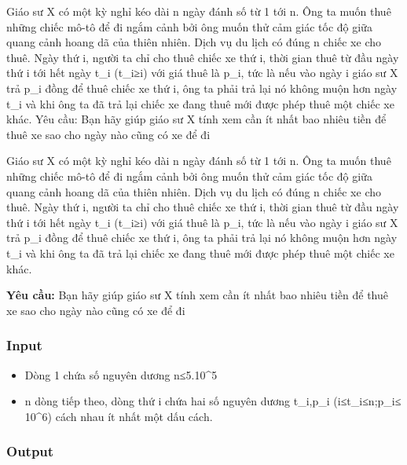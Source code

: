 



     Giáo sư X có một kỳ nghỉ kéo dài n ngày đánh số từ 1 tới n. Ông ta muốn thuê những chiếc mô-tô để đi ngắm cảnh bởi ông muốn thử cảm giác tốc độ giữa quang cảnh hoang dã của thiên nhiên. Dịch vụ du lịch có đúng n chiếc xe cho thuê. Ngày thứ i, người ta chỉ cho thuê chiếc xe thứ i, thời gian thuê từ đầu ngày thứ i tới hết ngày t\_i (t\_i≥i) với giá thuê là p\_i, tức là nếu vào ngày i giáo sư X trả p\_i đồng để thuê chiếc xe thứ i, ông ta phải trả lại nó không muộn hơn ngày t\_i và khi ông ta đã trả lại chiếc xe đang thuê mới được phép thuê một chiếc xe khác.       Yêu cầu: Bạn hãy giúp giáo sư X tính xem cần ít nhất bao nhiêu tiền để thuê xe sao cho ngày nào cũng có xe để đi    



   Giáo sư X có một kỳ nghỉ kéo dài n ngày đánh số từ 1 tới n. Ông ta muốn thuê những chiếc mô-tô để đi ngắm cảnh bởi ông muốn thử cảm giác tốc độ giữa quang cảnh hoang dã của thiên nhiên. Dịch vụ du lịch có đúng n chiếc xe cho thuê. Ngày thứ i, người ta chỉ cho thuê chiếc xe thứ i, thời gian thuê từ đầu ngày thứ i tới hết ngày t\_i (t\_i≥i) với giá thuê là p\_i, tức là nếu vào ngày i giáo sư X trả p\_i đồng để thuê chiếc xe thứ i, ông ta phải trả lại nó không muộn hơn ngày t\_i và khi ông ta đã trả lại chiếc xe đang thuê mới được phép thuê một chiếc xe khác.  

\textbf{Yêu cầu:}   Bạn hãy giúp giáo sư X tính xem cần ít nhất bao nhiêu tiền để thuê xe sao cho ngày nào cũng có xe để đi  





\subsubsection{   Input  }


\begin{itemize}
	\item     Dòng 1 chứa số nguyên dương n≤5.10^5   
	\item     n dòng tiếp theo, dòng thứ i chứa hai số nguyên dương t\_i,p\_i (i≤t\_i≤n;p\_i≤ 10^6) cách nhau ít nhất một dấu cách.   
\end{itemize}



\subsubsection{   Output  }

